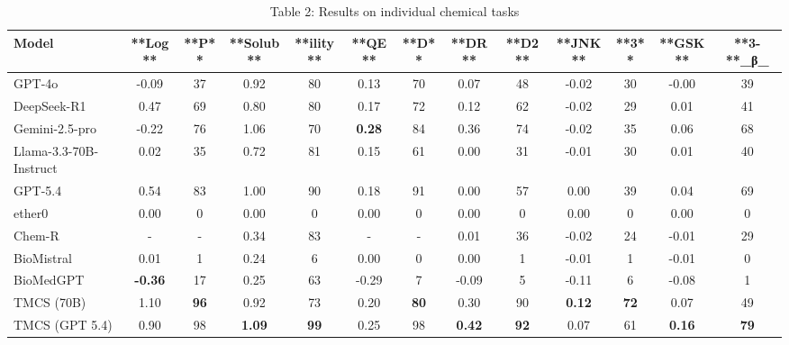 \begin{table}[t]
\centering
\caption{Table 2: Results on individual chemical tasks}
\label{tab:2609.35336}
\begin{tabular}{lcccccccccccc}
\toprule
Model & **Log** & **P** & **Solub** & **ility** & **QE** & **D** & **DR** & **D2** & **JNK** & **3** & **GSK** & **3-**\_β\_ \\
\midrule
GPT-4o & -0.09 & 37 & 0.92 & 80 & 0.13 & 70 & 0.07 & 48 & -0.02 & 30 & -0.00 & 39 \\
DeepSeek-R1 & 0.47 & 69 & 0.80 & 80 & 0.17 & 72 & 0.12 & 62 & -0.02 & 29 & 0.01 & 41 \\
Gemini-2.5-pro & -0.22 & 76 & 1.06 & 70 & \textbf{0.28} & 84 & 0.36 & 74 & -0.02 & 35 & 0.06 & 68 \\
Llama-3.3-70B-Instruct & 0.02 & 35 & 0.72 & 81 & 0.15 & 61 & 0.00 & 31 & -0.01 & 30 & 0.01 & 40 \\
GPT-5.4 & 0.54 & 83 & 1.00 & 90 & 0.18 & 91 & 0.00 & 57 & 0.00 & 39 & 0.04 & 69 \\
ether0 & 0.00 & 0 & 0.00 & 0 & 0.00 & 0 & 0.00 & 0 & 0.00 & 0 & 0.00 & 0 \\
Chem-R & - & - & 0.34 & 83 & - & - & 0.01 & 36 & -0.02 & 24 & -0.01 & 29 \\
BioMistral & 0.01 & 1 & 0.24 & 6 & 0.00 & 0 & 0.00 & 1 & -0.01 & 1 & -0.01 & 0 \\
BioMedGPT & \textbf{-0.36} & 17 & 0.25 & 63 & -0.29 & 7 & -0.09 & 5 & -0.11 & 6 & -0.08 & 1 \\
TMCS (70B) & 1.10 & \textbf{96} & 0.92 & 73 & 0.20 & \textbf{80} & 0.30 & 90 & \textbf{0.12} & \textbf{72} & 0.07 & 49 \\
TMCS (GPT 5.4) & 0.90 & 98 & \textbf{1.09} & \textbf{99} & 0.25 & 98 & \textbf{0.42} & \textbf{92} & 0.07 & 61 & \textbf{0.16} & \textbf{79} \\
\bottomrule
\end{tabular}
\end{table}
